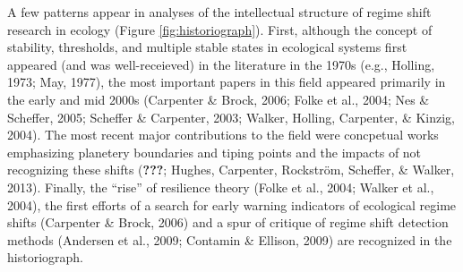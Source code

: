 \documentclass[12pt,twoside,openany]{reedthesis}
\begin{document}
A few patterns appear in analyses of the intellectual structure of regime shift research in ecology (Figure \ref{fig:historiograph}). First, although the concept of stability, thresholds, and multiple stable states in ecological systems first appeared (and was well-receieved) in the literature in the 1970s (e.g., Holling, 1973; May, 1977), the most important papers in this field appeared primarily in the early and mid 2000s (Carpenter \& Brock, 2006; Folke et al., 2004; Nes \& Scheffer, 2005; Scheffer \& Carpenter, 2003; Walker, Holling, Carpenter, \& Kinzig, 2004). The most recent major contributions to the field were concpetual works emphasizing planetery boundaries and tiping points and the impacts of not recognizing these shifts ({\textbf{???}}; Hughes, Carpenter, Rockström, Scheffer, \& Walker, 2013). Finally, the ``rise'' of resilience theory (Folke et al., 2004; Walker et al., 2004), the first efforts of a search for early warning indicators of ecological regime shifts (Carpenter \& Brock, 2006) and a spur of critique of regime shift detection methods (Andersen et al., 2009; Contamin \& Ellison, 2009) are recognized in the historiograph.
\end{document}
